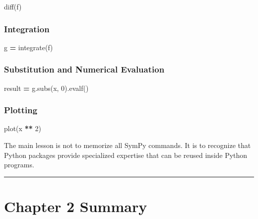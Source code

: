 \documentclass[
]{article}
\newenvironment{Shaded}{\begin{snugshade}}{\end{snugshade}}
\newcommand{\DecValTok}[1]{\textcolor[rgb]{0.00,0.00,0.81}{#1}}
\newcommand{\NormalTok}[1]{#1}
\newcommand{\OperatorTok}[1]{\textcolor[rgb]{0.81,0.36,0.00}{\textbf{#1}}}
\begin{document}
\begin{Shaded}
\begin{Highlighting}[]
\NormalTok{diff(f)}
\end{Highlighting}
\end{Shaded}

\subsubsection{Integration}\label{integration}

\begin{Shaded}
\begin{Highlighting}[]
\NormalTok{g }\OperatorTok{=}\NormalTok{ integrate(f)}
\end{Highlighting}
\end{Shaded}

\subsubsection{Substitution and Numerical
Evaluation}\label{substitution-and-numerical-evaluation}

\begin{Shaded}
\begin{Highlighting}[]
\NormalTok{result }\OperatorTok{=}\NormalTok{ g.subs(x, }\DecValTok{0}\NormalTok{).evalf()}
\end{Highlighting}
\end{Shaded}

\subsubsection{Plotting}\label{plotting}

\begin{Shaded}
\begin{Highlighting}[]
\NormalTok{plot(x }\OperatorTok{**} \DecValTok{2}\NormalTok{)}
\end{Highlighting}
\end{Shaded}

The main lesson is not to memorize all SymPy commands. It is to
recognize that Python packages provide specialized expertise that can be
reused inside Python programs.

\begin{center}\rule{0.5\linewidth}{0.5pt}\end{center}

\section{Chapter 2 Summary}\label{chapter-2-summary}
\end{document}
